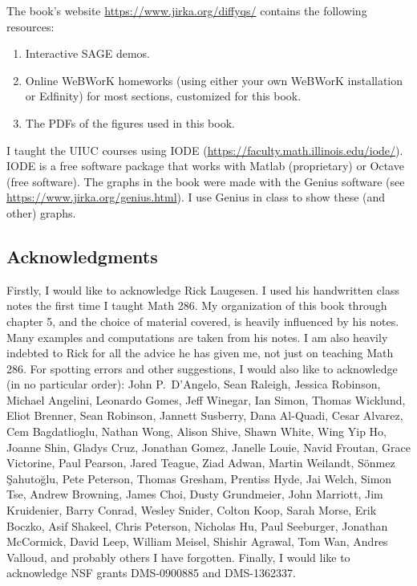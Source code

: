 The book's
website \url{https://www.jirka.org/diffyqs/}
contains the following resources:
\begin{enumerate}
\item Interactive SAGE demos.
\item Online WeBWorK homeworks
(using either your own WeBWorK installation or Edfinity)
for most sections, customized for this book.
\item The PDFs of the figures used in this book.
\end{enumerate}

I taught the UIUC courses using IODE
(\url{https://faculty.math.illinois.edu/iode/}).
IODE is a free software package that
works with Matlab (proprietary) or Octave (free software).
The graphs in the book were made with
the Genius software
(see \url{https://www.jirka.org/genius.html}).  I use Genius
in class to show these (and other) graphs.



\subsection*{Acknowledgments}

Firstly, I would like to acknowledge Rick Laugesen.  I used his handwritten
class notes
the first time I taught
Math 286.  My organization of this book through chapter 5,
and the choice of
material covered, is heavily influenced by his notes.  Many
examples and computations are taken from his notes.  I am also heavily
indebted to Rick for all the advice he has given me, not just on teaching
Math 286.
For spotting errors and other suggestions,
I would also like to acknowledge (in no particular order):
John P.\ D'Angelo,
Sean Raleigh, Jessica Robinson, Michael Angelini, Leonardo Gomes, Jeff
Winegar, Ian Simon, Thomas Wicklund, Eliot Brenner, Sean Robinson,
Jannett Susberry, Dana Al-Quadi, Cesar Alvarez, Cem Bagdatlioglu,
Nathan Wong, Alison Shive, Shawn White, Wing Yip Ho, Joanne Shin,
Gladys Cruz, Jonathan Gomez, Janelle Louie, Navid Froutan,
Grace Victorine, Paul Pearson, Jared Teague, Ziad Adwan,
Martin Weilandt, S\"{o}nmez \c{S}ahuto\u{g}lu,
Pete Peterson, Thomas Gresham, Prentiss Hyde, Jai Welch,
Simon Tse, Andrew Browning, James Choi, Dusty Grundmeier,
John Marriott,
Jim Kruidenier,
Barry Conrad,
Wesley Snider,
Colton Koop,
Sarah Morse,
Erik Boczko,
Asif Shakeel,
Chris Peterson,
Nicholas Hu,
Paul Seeburger,
Jonathan McCormick,
David Leep,
William Meisel,
Shishir Agrawal,
Tom Wan,
Andres Valloud,
and probably others I
have forgotten.
Finally, I would like
to acknowledge NSF grants DMS-0900885 and DMS-1362337.